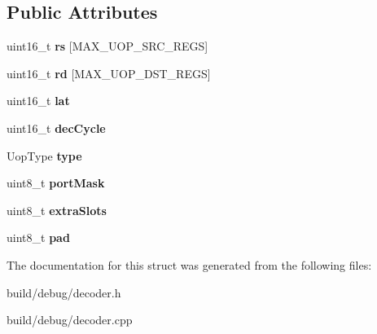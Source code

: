 \subsection*{Public Attributes}
\begin{DoxyCompactItemize}
\item 
\hypertarget{structDynUop_ac5be7245726ce1f64752de1610a0348d}{uint16\-\_\-t {\bfseries rs} \mbox{[}M\-A\-X\-\_\-\-U\-O\-P\-\_\-\-S\-R\-C\-\_\-\-R\-E\-G\-S\mbox{]}}\label{structDynUop_ac5be7245726ce1f64752de1610a0348d}

\item 
\hypertarget{structDynUop_a45b7997f7934349ec81f0cab48f58afc}{uint16\-\_\-t {\bfseries rd} \mbox{[}M\-A\-X\-\_\-\-U\-O\-P\-\_\-\-D\-S\-T\-\_\-\-R\-E\-G\-S\mbox{]}}\label{structDynUop_a45b7997f7934349ec81f0cab48f58afc}

\item 
\hypertarget{structDynUop_a8f4dd7055e58cce2acd4a21d7866f911}{uint16\-\_\-t {\bfseries lat}}\label{structDynUop_a8f4dd7055e58cce2acd4a21d7866f911}

\item 
\hypertarget{structDynUop_a51505d0954480a5b856a4b9342357f48}{uint16\-\_\-t {\bfseries dec\-Cycle}}\label{structDynUop_a51505d0954480a5b856a4b9342357f48}

\item 
\hypertarget{structDynUop_a5a309347ba3cd03722933cc76d602901}{Uop\-Type {\bfseries type}}\label{structDynUop_a5a309347ba3cd03722933cc76d602901}

\item 
\hypertarget{structDynUop_a70216f1b9716267522764b6bf87df694}{uint8\-\_\-t {\bfseries port\-Mask}}\label{structDynUop_a70216f1b9716267522764b6bf87df694}

\item 
\hypertarget{structDynUop_a34d22710b2f2a95b0012ca52d2b5676e}{uint8\-\_\-t {\bfseries extra\-Slots}}\label{structDynUop_a34d22710b2f2a95b0012ca52d2b5676e}

\item 
\hypertarget{structDynUop_ab46ee8d7a4e65c672e47a9c162704f76}{uint8\-\_\-t {\bfseries pad}}\label{structDynUop_ab46ee8d7a4e65c672e47a9c162704f76}

\end{DoxyCompactItemize}


The documentation for this struct was generated from the following files\-:\begin{DoxyCompactItemize}
\item 
build/debug/decoder.\-h\item 
build/debug/decoder.\-cpp\end{DoxyCompactItemize}
